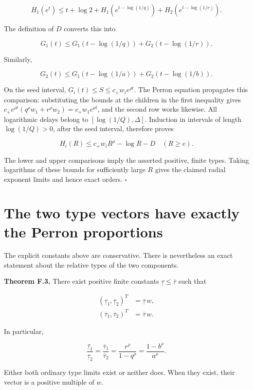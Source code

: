 \[
H_1(e^t)\le t+\log2
 +H_1(e^{t-\log(1/q)})+H_2(e^{t-\log(1/r)}).
\]

The definition of \(D\) converts this into

\[
G_1(t)\le G_1(t-\log(1/q))+G_2(t-\log(1/r)).
\]

Similarly,

\[
G_2(t)\le G_1(t-\log(1/a))+G_2(t-\log(1/b)).
\]

On the seed interval, \(G_i(t)\le S\le c_+w_i e^{\rho t}\). The Perron
equation propagates this comparison: substituting the bounds at the
children in the first inequality gives
\(c_+e^{\rho t}(q^\rho w_1+r^\rho w_2)=c_+w_1e^{\rho t}\), and the
second row works likewise. All logarithmic delays belong to
\([\log(1/Q),\Delta]\). Induction in intervals of length
\(\log(1/Q)>0\), after the seed interval, therefore proves

\[
\boxed{H_i(R)\le c_+w_iR^\rho-\log R-D\quad(R\ge e).}
\]

The lower and upper comparisons imply the asserted positive, finite
types. Taking logarithms of these bounds for sufficiently large \(R\)
gives the claimed radial exponent limits and hence exact orders.
\(\square\)

\hypertarget{v11-coupled_growth_full-the-two-type-vectors-have-exactly-the-perron-proportions}{%
\section{The two type vectors have exactly the Perron
proportions}\label{v11-coupled_growth_full-the-two-type-vectors-have-exactly-the-perron-proportions}}

The explicit constants above are conservative. There is nevertheless an
exact statement about the relative types of the two components.

\textbf{Theorem F.3.} There exist positive finite constants
\(\underline\tau\le\overline\tau\) such that

\[
\boxed{\begin{aligned}
(\underline\tau_1,\underline\tau_2)^T&=\underline\tau\,w,\\
(\overline\tau_1,\overline\tau_2)^T&=\overline\tau\,w.
\end{aligned}}
\]

In particular,

\[
\frac{\underline\tau_1}{\underline\tau_2}
=\frac{\overline\tau_1}{\overline\tau_2}
=\frac{r^\rho}{1-q^\rho}
=\frac{1-b^\rho}{a^\rho}.
\]

Either both ordinary type limits exist or neither does. When they exist,
their vector is a positive multiple of \(w\).


